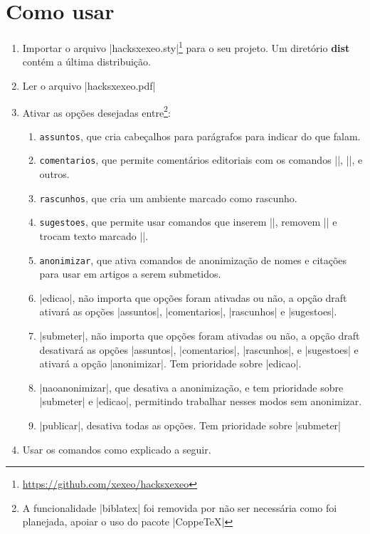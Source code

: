 \documentclass{article}
\begin{document}
    \section{Como usar}
    
    \begin{enumerate}
        \item Importar o arquivo |hacksxexeo.sty|\footnote{\url{https://github.com/xexeo/hacksxexeo}} para o seu  projeto. 
        Um diretório \textbf{dist} contém a última distribuição.
        \item Ler o arquivo |hacksxexeo.pdf|
        \item Ativar as opções desejadas entre\footnote{A funcionalidade |biblatex| foi removida por não ser necessária como foi planejada, apoiar o uso do pacote |CoppeTeX|}:
        \begin{enumerate}
            \item \verb!assuntos!, que cria cabeçalhos para parágrafos para indicar do que falam.
            \item \verb!comentarios!, que permite comentários editoriais com os comandos |\cand{}|, |\candr|, e outros.
            \item \verb!rascunhos!, que cria um ambiente marcado como rascunho.
            \item \verb!sugestoes!, que permite usar comandos que inserem |\candsug|, removem |\candrem| e trocam texto marcado |\candtroca|.
            \item \verb!anonimizar!, que ativa comandos de anonimização de nomes e citações para usar em artigos a serem submetidos.
            \item |edicao|, não importa que opções foram ativadas ou não, a opção draft ativará as opções |assuntos|, |comentarios|, |rascunhos| e |sugestoes|.
            \item |submeter|, não importa que opções foram ativadas ou não, a opção draft desativará as opções |assuntos|, |comentarios|, |rascunhos|, e |sugestoes| e ativará a opção |anonimizar|. Tem prioridade sobre |edicao|.
            \item |naoanonimizar|, que desativa a anonimização, e tem prioridade sobre |submeter| e |edicao|, permitindo trabalhar nesses modos sem anonimizar. 
            \item |publicar|, desativa todas as opções.  Tem prioridade sobre |submeter|
        \end{enumerate}
        \item Usar os comandos como explicado a seguir.
    \end{enumerate}
    
\end{document}

